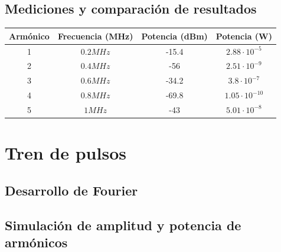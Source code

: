 \documentclass[../../labo_tp5_main.tex]{subfiles}
\begin{document}
\subsection{Mediciones y comparación de resultados}
\begin{table}[H] %
	\centering
 		\begin{tabular}{||c c c c||} 
 			\hline
			Armónico & Frecuencia (MHz) & Potencia (dBm) & Potencia (W)\\ [0.5ex] 
 			\hline\hline
			1 & $0.2MHz$ & -15.4 & $2.88\cdot 10^{-5}$\\
			2 & $0.4MHz$ & -56 & $2.51\cdot 10^{-9}$\\
			3 & $0.6MHz$ & -34.2 & $3.8\cdot 10^{-7}$\\
			4 & $0.8MHz$ & -69.8 & $1.05\cdot 10^{-10}$\\
			5 & $1MHz$ & -43 & $5.01\cdot 10^{-8}$\\[1ex] 
			\hline
		\end{tabular}
\end{table}


\section{Tren de pulsos}

\subsection{Desarrollo de Fourier}

\subsection{Simulación de amplitud y potencia de armónicos}
\end{document}

